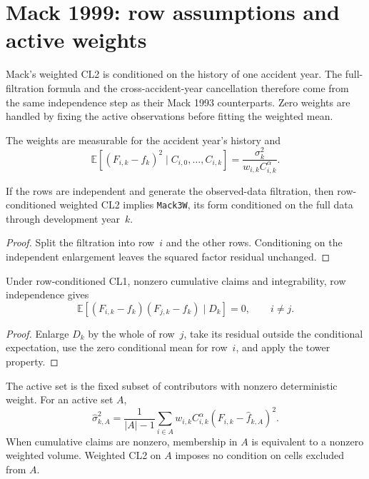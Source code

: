 \chapter{Mack 1999: row assumptions and active weights}

Mack's weighted CL2 is conditioned on the history of one accident year.  The
full-filtration formula and the cross-accident-year cancellation therefore
come from the same independence step as their Mack 1993 counterparts.  Zero
weights are handled by fixing the active observations before fitting the
weighted mean.

\begin{definition}
\label{def:mack3w-row}
\leanok
The weights are measurable for the accident year's history and
\[
 \mathbb E\!\left[(F_{i,k}-f_k)^2\mid C_{i,0},\ldots,C_{i,k}\right]
 = \frac{\sigma_k^2}{w_{i,k}C_{i,k}^{\alpha}}.
\]
\end{definition}

\begin{theorem}
\label{thm:mack3w-row-transport}
\leanok
{}
If the rows are independent and generate the observed-data filtration, then
row-conditioned weighted CL2 implies \texttt{Mack3W}, its form conditioned on
the full data through development year~$k$.
\end{theorem}
\begin{proof}\leanok
Split the filtration into row~$i$ and the other rows.  Conditioning on the
independent enlargement leaves the squared factor residual unchanged.
\end{proof}

\begin{theorem}
\label{thm:mack2-factor-rows}
\leanok
Under row-conditioned CL1, nonzero cumulative claims and integrability, row
independence gives
\[
 \mathbb E[(F_{i,k}-f_k)(F_{j,k}-f_k)\mid D_k]=0,
 \qquad i\ne j.
\]
\end{theorem}
\begin{proof}\leanok
Enlarge $D_k$ by the whole of row~$j$, take its residual outside the
conditional expectation, use the zero conditional mean for row~$i$, and
apply the tower property.
\end{proof}

\begin{definition}
\label{def:sigma2w-active}
\leanok
The active set is the fixed subset of contributors with nonzero deterministic
weight.  For an active set $A$,
\[
 \widehat\sigma_{k,A}^2
 =\frac{1}{|A|-1}\sum_{i\in A}w_{i,k}C_{i,k}^{\alpha}
   (F_{i,k}-\widehat f_{k,A})^2.
\]
When cumulative claims are nonzero, membership in $A$ is equivalent to a
nonzero weighted volume.  Weighted CL2 on $A$ imposes no condition on cells
excluded from $A$.
\end{definition}

